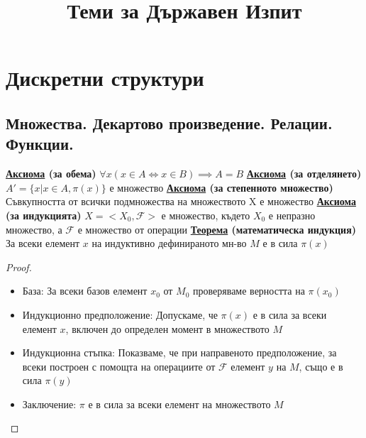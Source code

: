 \documentclass{article}
\begin{document}
\title{Теми за Държавен Изпит}
\author{}
\maketitle

\section*{Дискретни структури}

\subsection*{Множества. Декартово произведение. Релации. Функции.}

\textbf{\underline{Аксиома} (за обема)} \newline $\forall x (x \in A \iff x \in B) \implies A = B$ \newline\newline
\textbf{\underline{Аксиома} (за отделянето)} \newline $A' = \{x | x \in A, \pi(x)\}$ е множество \newline\newline
\textbf{\underline{Аксиома} (за степенното множество)} \newline Съвкупността от всички подмножества на множеството
X е множество \newline\newline
\textbf{\underline{Аксиома} (за индукцията)} \newline $X = <X_0, \mathcal{F}>$ е множество, където $X_0$ е непразно
множество, а $\mathcal{F}$ е множество от операции \newline\newline
\textbf{\underline{Теорема} (математическа индукция)} \newline
За всеки елемент $x$ на индуктивно дефинираното мн-во $M$ е в сила $\pi(x)$
\begin{proof}
    $ $\newline
    \begin{itemize}
        \item База: За всеки базов елемент $x_0$ от $M_0$ проверяваме верността на $\pi(x_0)$
        \item Индукционно предположение: Допускаме, че $\pi(x)$ е в сила за всеки елемент $x$, включен до определен
        момент в множеството $M$
        \item Индукционна стъпка: Показваме, че при направеното предположение, за всеки построен с помощта на
        операциите от $\mathcal{F}$ елемент $y$ на $M$, също е в сила $\pi(y)$
        \item Заключение: $\pi$ е в сила за всеки елемент на множеството $M$
    \end{itemize}
\end{proof}
\end{document}
